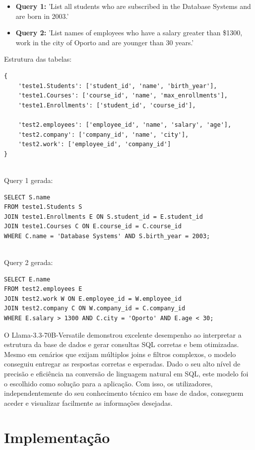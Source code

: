 \documentclass{article}
\begin{document}
\begin{itemize}
    \item \textbf{Query 1:} 'List all students who are subscribed in the Database Systems and are born in 2003.'
    \item \textbf{Query 2:} 'List names of employees who have a salary greater than \$1300, work in the city of Oporto and are younger than 30 years.'
\end{itemize}
Estrutura das tabelas:
\begin{lstlisting}
{
    'teste1.Students': ['student_id', 'name', 'birth_year'],
    'teste1.Courses': ['course_id', 'name', 'max_enrollments'],
    'teste1.Enrollments': ['student_id', 'course_id'], 
    
    'test2.employees': ['employee_id', 'name', 'salary', 'age'],
    'test2.company': ['company_id', 'name', 'city'], 
    'test2.work': ['employee_id', 'company_id']
}
\end{lstlisting}
\\
Query 1 gerada:
\begin{lstlisting}
SELECT S.name
FROM teste1.Students S
JOIN teste1.Enrollments E ON S.student_id = E.student_id
JOIN teste1.Courses C ON E.course_id = C.course_id
WHERE C.name = 'Database Systems' AND S.birth_year = 2003;
\end{lstlisting}
\\
Query 2 gerada:
\begin{lstlisting}
SELECT E.name
FROM test2.employees E
JOIN test2.work W ON E.employee_id = W.employee_id
JOIN test2.company C ON W.company_id = C.company_id
WHERE E.salary > 1300 AND C.city = 'Oporto' AND E.age < 30;
\end{lstlisting}

O Llama-3.3-70B-Versatile demonstrou excelente desempenho ao interpretar a estrutura da base de dados e gerar consultas SQL corretas e bem otimizadas. Mesmo em cenários que exijam múltiplos joins e filtros complexos, o modelo conseguiu entregar as respostas corretas e esperadas. Dado o seu alto nível de precisão e eficiência na conversão de linguagem natural em SQL, este modelo foi o escolhido como solução para a aplicação. Com isso, os utilizadores, independentemente do seu conhecimento técnico em base de dados, conseguem aceder e visualizar facilmente as informações desejadas.

\section{Implementação}
\end{document}
